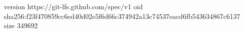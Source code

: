 version https://git-lfs.github.com/spec/v1
oid sha256:f23f470859cc6ed40d02e5f6d66c374942a13c74537eacd6fb543634867c6137
size 349692
